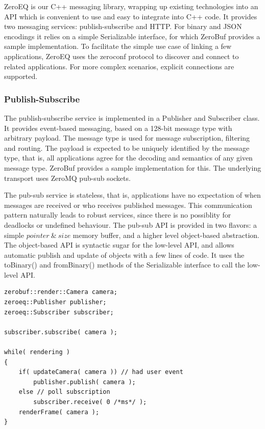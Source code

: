 \documentclass[10pt]{llncs}
\begin{document}
ZeroEQ is our C++ messaging library, wrapping up existing technologies into an
API which is convenient to use and easy to integrate into C++ code. It provides
two messaging services: publish-subscribe and HTTP. For binary and JSON
encodings it relies on a simple \textsf{Serializable} interface, for which
ZeroBuf provides a sample implementation. To facilitate the simple use case of
linking a few applications, ZeroEQ uses the zeroconf protocol to discover and
connect to related applications. For more complex scenarios, explicit
connections are supported.

\subsubsection{Publish-Subscribe}

The publish-subscribe service is implemented in a \textsf{Publisher} and
\textsf{Subscriber} class. It provides event-based messaging, based on a 128-bit
message type with arbitrary payload. The message type is used for message
subscription, filtering and routing. The payload is expected to be uniquely
identified by the message type, that is, all applications agree for the decoding
and semantics of any given message type. ZeroBuf provides a sample
implementation for this. The underlying transport uses ZeroMQ pub-sub sockets.

The pub-sub service is stateless, that is, applications have no expectation of
when messages are received or who receives published messages. This
communication pattern naturally leads to robust services, since there is no
possiblity for deadlocks or undefined behaviour. The pub-sub API is provided in
two flavors: a simple $pointer\ \&\ size$ memory buffer, and a higher level
object-based abstraction. The object-based API is syntactic sugar for the
low-level API, and allows automatic publish and update of objects with a few
lines of code. It uses the \textsf{toBinary()} and \textsf{fromBinary()} methods
of the \textsf{Serializable} interface to call the low-level API.

\begin{lstlisting}[float, caption=Publish-Subscribe Example, label=lPubSub]
zerobuf::render::Camera camera;
zeroeq::Publisher publisher;
zeroeq::Subscriber subscriber;

subscriber.subscribe( camera );

while( rendering )
{
    if( updateCamera( camera )) // had user event
        publisher.publish( camera );
    else // poll subscription
        subscriber.receive( 0 /*ms*/ );
    renderFrame( camera );
}
\end{lstlisting}
\end{document}
